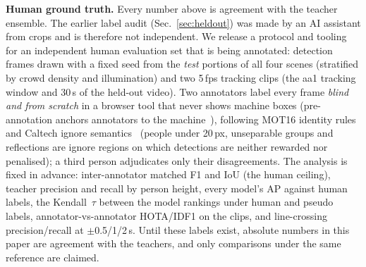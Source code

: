 \textbf{Human ground truth.} \ifHaveHuman\else
Every number above is agreement with the teacher ensemble. The earlier label audit (Sec.~\ref{sec:heldout}) was made
by an AI assistant from crops and is therefore not independent. We release a protocol and tooling for an
independent human evaluation set that is being annotated: \HuFramesPlanned{} detection frames drawn with a fixed
seed from the \emph{test} portions of all four scenes (stratified by crowd density and illumination) and two 5\,fps
tracking clips (the aa1 tracking window and 30\,s of the held-out video). Two annotators label every frame
\emph{blind and from scratch} in a browser tool that never shows machine boxes (pre-annotation anchors annotators to
the machine~\cite{berzak2016anchoring}), following MOT16 identity rules~\cite{milan2016mot16} and Caltech ignore
semantics~\cite{dollar2012pedestrian} (people under 20\,px, unseparable groups and reflections are ignore regions on
which detections are neither rewarded nor penalised); a third person adjudicates only their disagreements. The
analysis is fixed in advance: inter-annotator matched F1 and IoU (the human ceiling), teacher precision and recall
by person height, every model's AP against human labels, the Kendall~$\tau$ between the model rankings under human
and pseudo labels, annotator-vs-annotator HOTA/IDF1 on the clips, and line-crossing precision/recall at
$\pm$0.5/1/2\,s. Until these labels exist, absolute numbers in this paper are agreement with the teachers, and
only comparisons under the same reference are claimed.\fi
